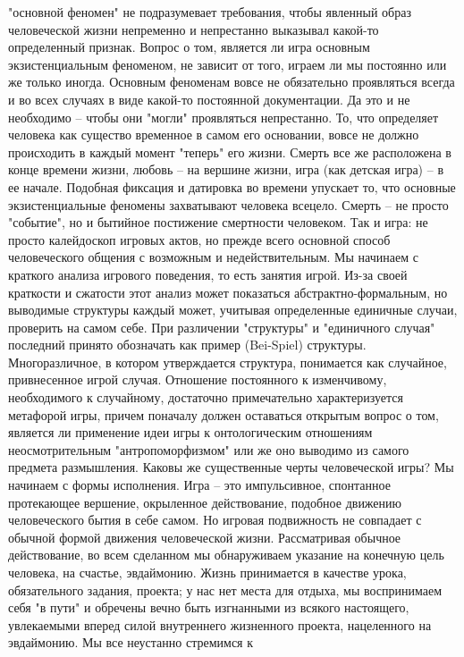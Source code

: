 \documentclass[12pt]{article}
\begin{document}
"основной феномен" не подразумевает требования, чтобы явленный образ человеческой жизни непременно и
непрестанно  выказывал  какой-то  определенный  признак.  Вопрос  о  том,  является  ли  игра  основным
экзистенциальным феноменом, не зависит от того, играем ли мы постоянно или же только иногда. Основным
феноменам  вовсе  не  обязательно  проявляться  всегда  и  во  всех  случаях  в  виде  какой-то  постоянной
документации. Да это и не необходимо -- чтобы они "могли" проявляться непрестанно. То, что определяет
человека как существо временное в самом его основании, вовсе не должно происходить в каждый момент
"теперь" его жизни. Смерть все же расположена в конце времени жизни, любовь -- на вершине жизни, игра (как
детская  игра)  --  в  ее  начале.  Подобная  фиксация  и  датировка  во  времени  упускает  то,  что  основные
экзистенциальные феномены захватывают человека всецело. Смерть -- не просто "событие", но и бытийное
постижение  смертности  человеком.  Так  и  игра:  не  просто  калейдоскоп  игровых  актов,  но  прежде  всего
основной способ человеческого общения с возможным и недействительным. Мы начинаем с краткого анализа
игрового поведения, то есть занятия игрой. Из-за своей краткости и сжатости этот анализ может показаться
абстрактно-формальным, но выводимые структуры каждый может, учитывая определенные единичные случаи,
проверить на самом себе. При различении "структуры" и "единичного случая" последний принято обозначать
как  пример  (Bei-Spiel)  структуры.  Многоразличное,  в  котором  утверждается  структура,  понимается  как
случайное, привнесенное игрой случая. Отношение постоянного к изменчивому, необходимого к случайному,
достаточно примечательно характеризуется метафорой игры, причем поначалу должен оставаться открытым
вопрос  о  том,  является  ли  применение  идеи  игры  к  онтологическим  отношениям  неосмотрительным
"антропоморфизмом" или же оно выводимо из самого предмета размышления. Каковы же существенные черты
человеческой игры? Мы начинаем с формы исполнения. Игра -- это импульсивное, спонтанное протекающее  
вершение,  окрыленное  действование,  подобное  движению  человеческого  бытия  в  себе  самом.  Но  игровая
подвижность  не  совпадает  с  обычной  формой  движения  человеческой  жизни.  Рассматривая  обычное
действование,  во  всем  сделанном  мы  обнаруживаем  указание  на  конечную  цель  человека,  на  счастье,
эвдаймонию. Жизнь принимается в качестве урока, обязательного задания, проекта; у нас нет места для отдыха,
мы воспринимаем себя "в пути" и обречены вечно быть изгнанными из всякого настоящего, увлекаемыми
вперед силой внутреннего жизненного проекта, нацеленного на эвдаймонию. Мы все неустанно стремимся к
\end{document}
